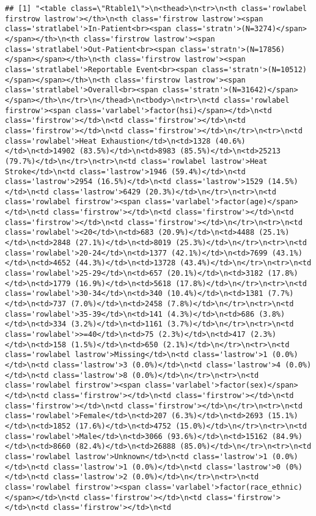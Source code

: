 \documentclass[
]{article}
\begin{document}
\begin{verbatim}
## [1] "<table class=\"Rtable1\">\n<thead>\n<tr>\n<th class='rowlabel firstrow lastrow'></th>\n<th class='firstrow lastrow'><span class='stratlabel'>In-Patient<br><span class='stratn'>(N=3274)</span></span></th>\n<th class='firstrow lastrow'><span class='stratlabel'>Out-Patient<br><span class='stratn'>(N=17856)</span></span></th>\n<th class='firstrow lastrow'><span class='stratlabel'>Reportable Event<br><span class='stratn'>(N=10512)</span></span></th>\n<th class='firstrow lastrow'><span class='stratlabel'>Overall<br><span class='stratn'>(N=31642)</span></span></th>\n</tr>\n</thead>\n<tbody>\n<tr>\n<td class='rowlabel firstrow'><span class='varlabel'>factor(hsi)</span></td>\n<td class='firstrow'></td>\n<td class='firstrow'></td>\n<td class='firstrow'></td>\n<td class='firstrow'></td>\n</tr>\n<tr>\n<td class='rowlabel'>Heat Exhaustion</td>\n<td>1328 (40.6%)</td>\n<td>14902 (83.5%)</td>\n<td>8983 (85.5%)</td>\n<td>25213 (79.7%)</td>\n</tr>\n<tr>\n<td class='rowlabel lastrow'>Heat Stroke</td>\n<td class='lastrow'>1946 (59.4%)</td>\n<td class='lastrow'>2954 (16.5%)</td>\n<td class='lastrow'>1529 (14.5%)</td>\n<td class='lastrow'>6429 (20.3%)</td>\n</tr>\n<tr>\n<td class='rowlabel firstrow'><span class='varlabel'>factor(age)</span></td>\n<td class='firstrow'></td>\n<td class='firstrow'></td>\n<td class='firstrow'></td>\n<td class='firstrow'></td>\n</tr>\n<tr>\n<td class='rowlabel'><20</td>\n<td>683 (20.9%)</td>\n<td>4488 (25.1%)</td>\n<td>2848 (27.1%)</td>\n<td>8019 (25.3%)</td>\n</tr>\n<tr>\n<td class='rowlabel'>20-24</td>\n<td>1377 (42.1%)</td>\n<td>7699 (43.1%)</td>\n<td>4652 (44.3%)</td>\n<td>13728 (43.4%)</td>\n</tr>\n<tr>\n<td class='rowlabel'>25-29</td>\n<td>657 (20.1%)</td>\n<td>3182 (17.8%)</td>\n<td>1779 (16.9%)</td>\n<td>5618 (17.8%)</td>\n</tr>\n<tr>\n<td class='rowlabel'>30-34</td>\n<td>340 (10.4%)</td>\n<td>1381 (7.7%)</td>\n<td>737 (7.0%)</td>\n<td>2458 (7.8%)</td>\n</tr>\n<tr>\n<td class='rowlabel'>35-39</td>\n<td>141 (4.3%)</td>\n<td>686 (3.8%)</td>\n<td>334 (3.2%)</td>\n<td>1161 (3.7%)</td>\n</tr>\n<tr>\n<td class='rowlabel'>>=40</td>\n<td>75 (2.3%)</td>\n<td>417 (2.3%)</td>\n<td>158 (1.5%)</td>\n<td>650 (2.1%)</td>\n</tr>\n<tr>\n<td class='rowlabel lastrow'>Missing</td>\n<td class='lastrow'>1 (0.0%)</td>\n<td class='lastrow'>3 (0.0%)</td>\n<td class='lastrow'>4 (0.0%)</td>\n<td class='lastrow'>8 (0.0%)</td>\n</tr>\n<tr>\n<td class='rowlabel firstrow'><span class='varlabel'>factor(sex)</span></td>\n<td class='firstrow'></td>\n<td class='firstrow'></td>\n<td class='firstrow'></td>\n<td class='firstrow'></td>\n</tr>\n<tr>\n<td class='rowlabel'>Female</td>\n<td>207 (6.3%)</td>\n<td>2693 (15.1%)</td>\n<td>1852 (17.6%)</td>\n<td>4752 (15.0%)</td>\n</tr>\n<tr>\n<td class='rowlabel'>Male</td>\n<td>3066 (93.6%)</td>\n<td>15162 (84.9%)</td>\n<td>8660 (82.4%)</td>\n<td>26888 (85.0%)</td>\n</tr>\n<tr>\n<td class='rowlabel lastrow'>Unknown</td>\n<td class='lastrow'>1 (0.0%)</td>\n<td class='lastrow'>1 (0.0%)</td>\n<td class='lastrow'>0 (0%)</td>\n<td class='lastrow'>2 (0.0%)</td>\n</tr>\n<tr>\n<td class='rowlabel firstrow'><span class='varlabel'>factor(race_ethnic)</span></td>\n<td class='firstrow'></td>\n<td class='firstrow'></td>\n<td class='firstrow'></td>\n<td 
\end{verbatim}
\end{document}
